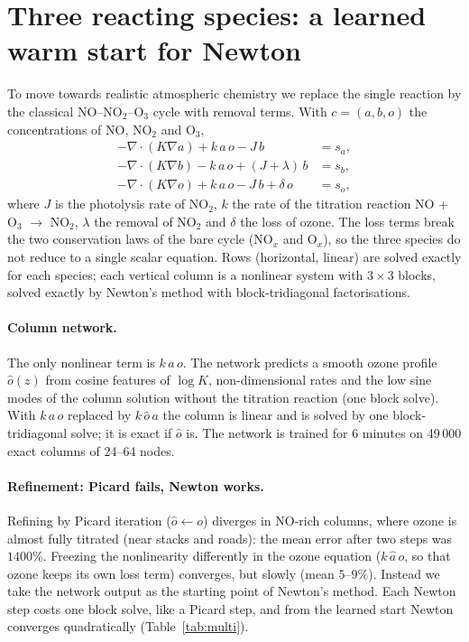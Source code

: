 \documentclass[11pt]{article}
\begin{document}
\section{Three reacting species: a learned warm start for Newton}
\label{sec:multi}

To move towards realistic atmospheric chemistry we replace the single reaction by the classical
NO--NO$_2$--O$_3$ cycle with removal terms. With $c=(a,b,o)$ the concentrations of NO, NO$_2$ and O$_3$,
\begin{align}
  -\nabla\cdot(K\nabla a) + k\,a\,o - J\,b &= s_a,\nonumber\\
  -\nabla\cdot(K\nabla b) - k\,a\,o + (J+\lambda)\,b &= s_b,\\
  -\nabla\cdot(K\nabla o) + k\,a\,o - J\,b + \delta\,o &= s_o,\nonumber
\end{align}
where $J$ is the photolysis rate of NO$_2$, $k$ the rate of the titration reaction NO + O$_3$ $\to$ NO$_2$,
$\lambda$ the removal of NO$_2$ and $\delta$ the loss of ozone. The loss terms break the two conservation laws
of the bare cycle (NO$_x$ and O$_x$), so the three species do not reduce to a single scalar equation. Rows
(horizontal, linear) are solved exactly for each species; each vertical column is a nonlinear system with
$3\times3$ blocks, solved exactly by Newton's method with block-tridiagonal factorisations.

\paragraph{Column network.}
The only nonlinear term is $k\,a\,o$. The network predicts a smooth ozone profile $\hat o(z)$ from cosine
features of $\log K$, non-dimensional rates and the low sine modes of the column solution without the
titration reaction (one block solve). With $k\,a\,o$ replaced by $k\,\hat o\,a$ the column is linear and is
solved by one block-tridiagonal solve; it is exact if $\hat o$ is. The network is trained for 6 minutes on
49\,000 exact columns of 24--64 nodes.

\paragraph{Refinement: Picard fails, Newton works.}
Refining by Picard iteration ($\hat o \leftarrow o$) diverges in NO-rich columns, where ozone is almost fully
titrated (near stacks and roads): the mean error after two steps was $1400\%$. Freezing the nonlinearity
differently in the ozone equation ($k\,\hat a\,o$, so that ozone keeps its own loss term) converges, but slowly
(mean $5$--$9\%$). Instead we take the network output as the starting point of Newton's method. Each Newton
step costs one block solve, like a Picard step, and from the learned start Newton converges quadratically
(Table~\ref{tab:multi}).
\end{document}
